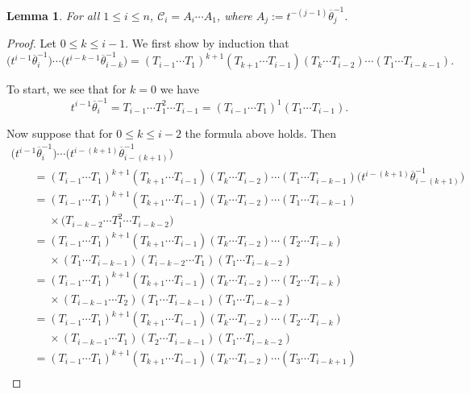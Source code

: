 \documentclass[pdftex]{sigma}
\numberwithin{equation}{section}
\newtheorem{Lemma}[Theorem]{Lemma}
\theoremstyle{definition}
\begin{document}
\begin{Lemma}\label{creation operators Lemma}
 For all $1 \leq i \leq n$,
$\mathscr{C}_i = A_i\cdots A_1$, where $A_j:= t^{-(j-1)}\overline{\theta}_j^{-1}$.
\end{Lemma}
\begin{proof}
 Let $0 \leq k \leq i-1$. We first show by induction that
 \[
 \bigl(t^{i-1}\overline{\theta}_{i}^{-1}\bigr)\cdots \bigl(t^{i-k-1}\overline{\theta}_{i-k}^{-1}\bigr) = (T_{i-1}\cdots T_1)^{k+1} (T_{k+1}\cdots T_{i-1})(T_k\cdots T_{i-2})\cdots (T_1\cdots T_{i-k-1}).
 \]

 To start, we see that for $k=0$ we have
 \[
 t^{i-1}\overline{\theta}_{i}^{-1} = T_{i-1}\cdots T_1^2 \cdots T_{i-1} = (T_{i-1}\cdots T_1)^{1} (T_1\cdots T_{i-1}).
 \]

 Now suppose that for $0 \leq k \leq i-2$ the formula above holds. Then
 \begin{gather*}
 \bigl(t^{i-1}\overline{\theta}_{i}^{-1}\bigr)\cdots \bigl(t^{i-(k+1)}\overline{\theta}_{i-(k+1)}^{-1}\bigr) \\
 \qquad = (T_{i-1}\cdots T_1)^{k+1} (T_{k+1}\cdots T_{i-1})(T_k\cdots T_{i-2})\cdots (T_1\cdots T_{i-k-1})\bigl(t^{i-(k+1)}\overline{\theta}_{i-(k+1)}^{-1}\bigr) \\
 \qquad = (T_{i-1}\cdots T_1)^{k+1} (T_{k+1}\cdots T_{i-1})(T_k\cdots T_{i-2})\cdots (T_1\cdots T_{i-k-1})\\
 \phantom{ \qquad = }{} \times\bigl(T_{i-k-2}\cdots T_1^2 \cdots T_{i-k-2}\bigr) \\
 \qquad = (T_{i-1}\cdots T_1)^{k+1} (T_{k+1}\cdots T_{i-1})(T_k\cdots T_{i-2})\cdots (T_2\cdots T_{i-k}) \\
 \phantom{ \qquad = }{} \times (T_1\cdots T_{i-k-1}) (T_{i-k-2}\cdots T_1)(T_1 \cdots T_{i-k-2}) \\
 \qquad = (T_{i-1}\cdots T_1)^{k+1} (T_{k+1}\cdots T_{i-1})(T_k\cdots T_{i-2})\cdots (T_2\cdots T_{i-k}) \\
 \phantom{ \qquad = }{} \times (T_{i-k-1}\cdots T_{2})(T_{1}\cdots T_{i-k-1})(T_1 \cdots T_{i-k-2}) \\
 \qquad = (T_{i-1}\cdots T_1)^{k+1} (T_{k+1}\cdots T_{i-1})(T_k\cdots T_{i-2})\cdots (T_2\cdots T_{i-k}) \\
 \phantom{ \qquad = }{} \times (T_{i-k-1}\cdots T_{1})(T_{2}\cdots T_{i-k-1})(T_1 \cdots T_{i-k-2}) \\
 \qquad = (T_{i-1}\cdots T_1)^{k+1} (T_{k+1}\cdots T_{i-1})(T_k\cdots T_{i-2})\cdots (T_3\cdots T_{i-k+1}) \\

\end{gather*}
\end{proof}
\end{document}
